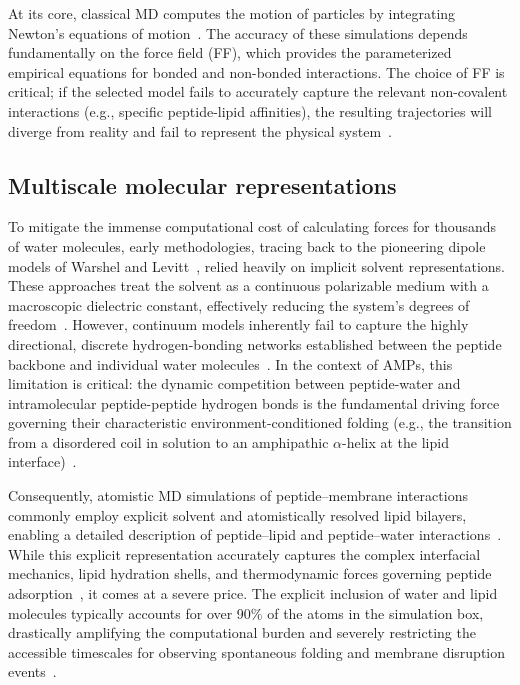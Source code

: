 At its core, classical MD computes the motion of particles by integrating Newton’s equations of motion~\cite{leyesnewton}. The accuracy of these simulations depends fundamentally on the force field (FF), which provides the parameterized empirical equations for bonded and non-bonded interactions. The choice of FF is critical; if the selected model fails to accurately capture the relevant non-covalent interactions (e.g., specific peptide-lipid affinities), the resulting trajectories will diverge from reality and fail to represent the physical system~\cite{braun2018best,force_field_protocol}.

\subsection{Multiscale molecular representations}

To mitigate the immense computational cost of calculating forces for thousands of water molecules, early methodologies, tracing back to the pioneering dipole models of Warshel and Levitt~\cite{WARSHEL1976227}, relied heavily on implicit solvent representations. These approaches treat the solvent as a continuous polarizable medium with a macroscopic dielectric constant, effectively reducing the system's degrees of freedom~\cite{implicit_solvent_model}. However, continuum models inherently fail to capture the highly directional, discrete hydrogen-bonding networks established between the peptide backbone and individual water molecules~\cite{implicit_vs_explicit}. In the context of AMPs, this limitation is critical: the dynamic competition between peptide-water and intramolecular peptide-peptide hydrogen bonds is the fundamental driving force governing their characteristic environment-conditioned folding (e.g., the transition from a disordered coil in solution to an amphipathic $\alpha$-helix at the lipid interface)~\cite{white1999membrane}.

Consequently, atomistic MD simulations of peptide--membrane interactions commonly employ explicit solvent and atomistically resolved lipid bilayers, enabling a detailed description of peptide--lipid and peptide--water interactions~\cite{hypothesis}. While this explicit representation accurately captures the complex interfacial mechanics, lipid hydration shells, and thermodynamic forces governing peptide adsorption~\cite{Kabelka2021,Marrink2019}, it comes at a severe price. The explicit inclusion of water and lipid molecules typically accounts for over 90\% of the atoms in the simulation box, drastically amplifying the computational burden and severely restricting the accessible timescales for observing spontaneous folding and membrane disruption events~\cite{Frenkel2023,implicit_solvent_model,martini2}.

